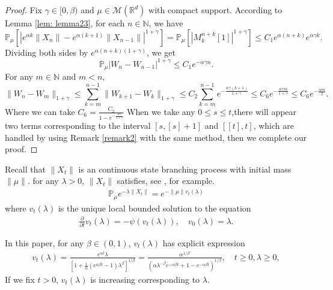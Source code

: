 \documentclass[12pt, a4paper]{amsart}
\theoremstyle{definition}
\numberwithin{equation}{section}
\begin{document}
\begin{proof}
    Fix $\gamma \in [0,\beta)$ and $\mu\in \mathcal M(\mathbb R^d)$ with compact support. 
    According to Lemma \ref{lem: lemma23}, for each $n \in \mathbb N$, we have
    $$ \mathbb{P}_{\mu}[|e^{\alpha k}\|X_n\|-e^{\alpha(k+1)}\|X_{n-1}\||^{1+\gamma}]
    = \mathbb P_\mu [|M^{n+k}_k[1]|^{1+\gamma}]
    \leq C_1 e^{\alpha(n+k)}e^{\alpha\gamma k}.$$
    Dividing both sides by $e^{\alpha(n+k)(1+\gamma)}$, we get
    $$\mathbb{P}_{\mu}\left|W_n-W_{n-1}\right|^{1+\gamma}\leq C_1 e^{-\alpha \gamma n}.$$
    For any $m\in \mathbb{N}$ and $m<n$,
    $$\|W_n-W_m\|_{1+\gamma}\leq \sum_{k=m}^{n-1}\|W_{k+1}-W_k\|_{1+\gamma}\leq C_2\sum_{k=m}^{n-1}e^{-\frac{\alpha\gamma(k+1)}{1+\gamma}}\leq C_6 e^{-\frac{\alpha\gamma m}{1+\gamma}}\leq C_6 e^{-\frac{\alpha m}{2}}.$$
    Where we can take $C_6=\frac{C_2}{1-e^{-\frac{\alpha \gamma}{1+\gamma}}}$
 When we take any $0\leq s\leq t$,there will appear two terms corresponding to the interval $[s,[s]+1]$ and $[[t],t]$, which are  handled by using Remark \ref{remark2} with the same method, then we complete our proof.
\end{proof}
Recall that $\|X_t\|$ is an continuous state branching process with initial mass $\|\mu\|$.
for any $\lambda>0$, $\|X_t\|$ satisfies, see \cite[Chapter 3]{Li2011Measure-valued}, for example.
\begin{align}\label{CSBP}
    \mathbb{P}_{\mu}e^{-\lambda\|X_t\|}=e^{-\|\mu\|v_t(\lambda)}
\end{align}
where $v_t(\lambda)$ is the unique local bounded solution to the equation 
\begin{align*}
    \frac{\partial}{\partial t}v_t(\lambda)=-\psi(v_t(\lambda)), \quad  v_0(\lambda)=\lambda.
\end{align*}

In this paper, for any $\beta\in (0,1)$, $v_t(\lambda)$ has explicit expression \cite[Example 3.1]{Li2011Measure-valued}
\begin{align*}
    v_t(\lambda)=\frac{e^{\alpha t} \lambda}{[1+\frac{1}{\alpha}(e^{\alpha \beta t}-1)\lambda^{\beta}]^{1/\beta}}=\frac{\alpha^{1/\beta}}{(\alpha\lambda^{-\beta}e^{-\alpha \beta t}+1-e^{-\alpha \beta t})^{1/\beta}},\quad t\geq 0,\lambda\geq 0, 
\end{align*}
If we fix $t>0$, $v_t(\lambda)$ is increasing corresponding to $\lambda$.
\end{document}
